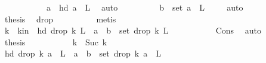 \begin{isabellebody}
\ {}\isanewline
\ \ \ \ \ \ \isamarkupfalse%
\ \isamarkupfalse%
\ {\isachardoublequoteopen}a\ {\isacharequal}{\kern0pt}\ hd\ {\isacharparenleft}{\kern0pt}a{}\ {\isacharhash}{\kern0pt}\ L{\isacharparenright}{\kern0pt}{\isachardoublequoteclose}\ \isamarkupfalse%
\ auto\isanewline
\ \ \ \ \ \ \isamarkupfalse%
\ \isamarkupfalse%
\ {\isachardoublequoteopen}b\ {\isasymin}\ set\ {\isacharparenleft}{\kern0pt}a{}\ {\isacharhash}{\kern0pt}\ L{\isacharparenright}{\kern0pt}{\isachardoublequoteclose}\ \isamarkupfalse%
\ {}\ \isamarkupfalse%
\ auto\isanewline
\ \ \ \ \ \ \isamarkupfalse%
\ \isamarkupfalse%
\ {\isacharquery}{\kern0pt}thesis\ \isamarkupfalse%
\ drop{}\isanewline
\ \ \ \ \ \ \ \ \isamarkupfalse%
\ metis\ \isanewline
\ \ \ \ \isamarkupfalse%
\isanewline
\ \ \ \ \ \ \isamarkupfalse%
\ {}\isanewline
\ \ \ \ \ \ \isamarkupfalse%
\ \isamarkupfalse%
\ k\ \ k{\isacharunderscore}{\kern0pt}in\ {\isacharcolon}{\kern0pt}\ {\isachardoublequoteopen}hd\ {\isacharparenleft}{\kern0pt}drop\ k\ {\isacharparenleft}{\kern0pt}L{\isacharparenright}{\kern0pt}{\isacharparenright}{\kern0pt}\ {\isacharequal}{\kern0pt}\ a\ {\isasymand}\ b\ {\isasymin}\ set\ {\isacharparenleft}{\kern0pt}drop\ k\ {\isacharparenleft}{\kern0pt}L{\isacharparenright}{\kern0pt}{\isacharparenright}{\kern0pt}{\isachardoublequoteclose}\ \isanewline
\ \ \ \ \ \ \ \ \isamarkupfalse%
\ Cons{\isacharparenleft}{\kern0pt}{}{\isacharparenright}{\kern0pt}\ \isamarkupfalse%
\ auto\isanewline
\ \ \ \ \ \ \isamarkupfalse%
\ {\isacharquery}{\kern0pt}thesis\ \isamarkupfalse%
\isanewline
\ \ \ \ \ \ \ \ \isamarkupfalse%
\ {\isacharquery}{\kern0pt}k\ {\isacharequal}{\kern0pt}\ {\isachardoublequoteopen}Suc\ k{\isachardoublequoteclose}\isanewline
\ \ \ \ \ \ \ \ \isamarkupfalse%
\ {\isachardoublequoteopen}hd\ {\isacharparenleft}{\kern0pt}drop\ {\isacharquery}{\kern0pt}k\ {\isacharparenleft}{\kern0pt}a{}\ {\isacharhash}{\kern0pt}\ L{\isacharparenright}{\kern0pt}{\isacharparenright}{\kern0pt}\ {\isacharequal}{\kern0pt}\ a\ {\isasymand}\ b\ {\isasymin}\ set\ {\isacharparenleft}{\kern0pt}drop\ {\isacharquery}{\kern0pt}k\ {\isacharparenleft}{\kern0pt}a{}\ {\isacharhash}{\kern0pt}\ L{\isacharparenright}{\kern0pt}{\isacharparenright}{\kern0pt}{\isachardoublequoteclose}\isanewline

\end{isabellebody}
